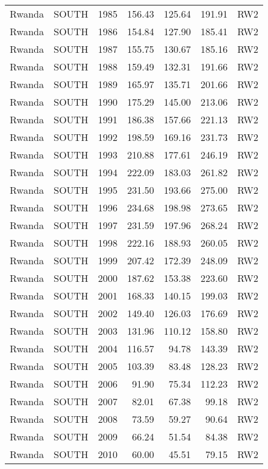 \begin{longtable}{lllrrrl}
  Rwanda & SOUTH & 1985 & 156.43 & 125.64 & 191.91 & RW2 \\ 
  Rwanda & SOUTH & 1986 & 154.84 & 127.90 & 185.41 & RW2 \\ 
  Rwanda & SOUTH & 1987 & 155.75 & 130.67 & 185.16 & RW2 \\ 
  Rwanda & SOUTH & 1988 & 159.49 & 132.31 & 191.66 & RW2 \\ 
  Rwanda & SOUTH & 1989 & 165.97 & 135.71 & 201.66 & RW2 \\ 
  Rwanda & SOUTH & 1990 & 175.29 & 145.00 & 213.06 & RW2 \\ 
  Rwanda & SOUTH & 1991 & 186.38 & 157.66 & 221.13 & RW2 \\ 
  Rwanda & SOUTH & 1992 & 198.59 & 169.16 & 231.73 & RW2 \\ 
  Rwanda & SOUTH & 1993 & 210.88 & 177.61 & 246.19 & RW2 \\ 
  Rwanda & SOUTH & 1994 & 222.09 & 183.03 & 261.82 & RW2 \\ 
  Rwanda & SOUTH & 1995 & 231.50 & 193.66 & 275.00 & RW2 \\ 
  Rwanda & SOUTH & 1996 & 234.68 & 198.98 & 273.65 & RW2 \\ 
  Rwanda & SOUTH & 1997 & 231.59 & 197.96 & 268.24 & RW2 \\ 
  Rwanda & SOUTH & 1998 & 222.16 & 188.93 & 260.05 & RW2 \\ 
  Rwanda & SOUTH & 1999 & 207.42 & 172.39 & 248.09 & RW2 \\ 
  Rwanda & SOUTH & 2000 & 187.62 & 153.38 & 223.60 & RW2 \\ 
  Rwanda & SOUTH & 2001 & 168.33 & 140.15 & 199.03 & RW2 \\ 
  Rwanda & SOUTH & 2002 & 149.40 & 126.03 & 176.69 & RW2 \\ 
  Rwanda & SOUTH & 2003 & 131.96 & 110.12 & 158.80 & RW2 \\ 
  Rwanda & SOUTH & 2004 & 116.57 & 94.78 & 143.39 & RW2 \\ 
  Rwanda & SOUTH & 2005 & 103.39 & 83.48 & 128.23 & RW2 \\ 
  Rwanda & SOUTH & 2006 & 91.90 & 75.34 & 112.23 & RW2 \\ 
  Rwanda & SOUTH & 2007 & 82.01 & 67.38 & 99.18 & RW2 \\ 
  Rwanda & SOUTH & 2008 & 73.59 & 59.27 & 90.64 & RW2 \\ 
  Rwanda & SOUTH & 2009 & 66.24 & 51.54 & 84.38 & RW2 \\ 
  Rwanda & SOUTH & 2010 & 60.00 & 45.51 & 79.15 & RW2 \\ 

\end{longtable}
